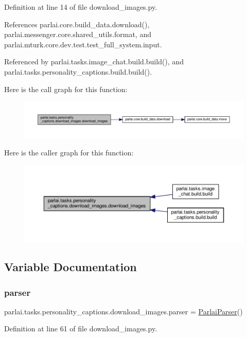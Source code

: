 Definition at line 14 of file download\+\_\+images.\+py.



References parlai.\+core.\+build\+\_\+data.\+download(), parlai.\+messenger.\+core.\+shared\+\_\+utils.\+format, and parlai.\+mturk.\+core.\+dev.\+test.\+test\+\_\+full\+\_\+system.\+input.



Referenced by parlai.\+tasks.\+image\+\_\+chat.\+build.\+build(), and parlai.\+tasks.\+personality\+\_\+captions.\+build.\+build().

Here is the call graph for this function\+:
\nopagebreak
\begin{figure}[H]
\begin{center}
\leavevmode
\includegraphics[width=350pt]{namespaceparlai_1_1tasks_1_1personality__captions_1_1download__images_a9d812a095ca6d48541b3d5cdc65a4bf3_cgraph}
\end{center}
\end{figure}
Here is the caller graph for this function\+:
\nopagebreak
\begin{figure}[H]
\begin{center}
\leavevmode
\includegraphics[width=350pt]{namespaceparlai_1_1tasks_1_1personality__captions_1_1download__images_a9d812a095ca6d48541b3d5cdc65a4bf3_icgraph}
\end{center}
\end{figure}


\subsection{Variable Documentation}
\mbox{\label{namespaceparlai_1_1tasks_1_1personality__captions_1_1download__images_ad569e6f3e90709b66c27bc16b83e9275}} 
\subsubsection{\texorpdfstring{parser}{parser}}
{\footnotesize\ttfamily parlai.\+tasks.\+personality\+\_\+captions.\+download\+\_\+images.\+parser = \hyperlink{classparlai_1_1core_1_1params_1_1ParlaiParser}{Parlai\+Parser}()}



Definition at line 61 of file download\+\_\+images.\+py.

